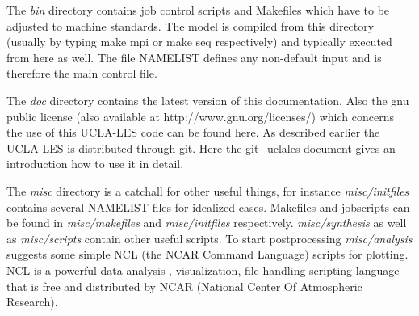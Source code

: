 \documentclass[11pt,a4paper]{article}
\begin{document}
The \emph{bin} directory contains job control scripts and Makefiles
which have to be adjusted to machine standards. The model is compiled
from this directory (usually by typing make mpi or make seq respectively)
and typically executed from here as well. The file NAMELIST defines any
non-default input and is therefore the main control file.

The \emph{doc} directory contains the latest version of this documentation.
Also the gnu public license (also available at http://www.gnu.org/licenses/) which
concerns the use of this UCLA-LES code can be found here. As described earlier the
UCLA-LES is distributed through git. Here the git\_uclales document gives an introduction
how to use it in detail.

The \emph{misc} directory is a catchall for other useful things, for instance 
\emph{misc/initfiles} contains several NAMELIST files for idealized cases.
Makefiles and jobscripts can be found in \emph{misc/makefiles} and 
\emph{misc/initfiles} respectively. \emph{misc/synthesis} as well as
\emph{misc/scripts} contain other useful scripts.
To start postprocessing \emph{misc/analysis} suggests some simple NCL
(the NCAR Command Language) scripts for plotting. NCL is a powerful
data analysis , visualization, file-handling scripting language that
is free and distributed by NCAR (National Center Of Atmospheric Research).
\end{document}

